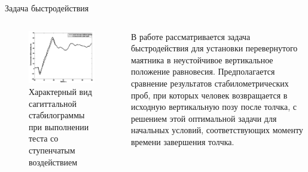\documentclass[10pt]{beamer}
\begin{document}
\begin{frame}{Задача быстродействия}
	\begin{columns}
		\begin{figure}[h!]
			\includegraphics[width=1\linewidth]{images/stabilos.png}
			\caption{Характерный вид сагиттальной стабилограммы при выполнении теста со ступенчатым воздействием}
		\end{figure}
		В работе рассматривается задача быстродействия для установки
		перевернутого маятника в неустойчивое вертикальное положение
		равновесия. Предполагается сравнение результатов стабилометрических
		проб, при которых человек возвращается в исходную вертикальную
		позу после толчка, с решением этой оптимальной задачи для начальных
		условий, соответствующих моменту времени завершения толчка.
	\end{columns}
\end{frame}
\end{document}
